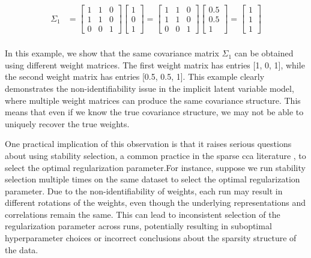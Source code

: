 \begin{align}
    \Sigma_{1} &= \begin{bmatrix}
                         1 & 1 & 0 \\
                         1 & 1 & 0 \\
                         0 & 0 & 1
    \end{bmatrix}\begin{bmatrix}
                     1 \\
                     0 \\
                     1
    \end{bmatrix}=
    \begin{bmatrix}
        1 & 1 & 0 \\
        1 & 1 & 0 \\
        0 & 0 & 1
    \end{bmatrix}\begin{bmatrix}
                     0.5 \\
                     0.5 \\
                     1
    \end{bmatrix}= \begin{bmatrix}
                        1 \\
                        1 \\
                        1
    \end{bmatrix} \\
\end{align}

In this example, we show that the same covariance matrix $\Sigma_1$ can be obtained using different weight matrices. The first weight matrix has entries [1, 0, 1], while the second weight matrix has entries [0.5, 0.5, 1]. This example clearly demonstrates the non-identifiability issue in the implicit latent variable model, where multiple weight matrices can produce the same covariance structure. This means that even if we know the true covariance structure, we may not be able to uniquely recover the true weights.

One practical implication of this observation is that it raises serious questions about using stability selection, a common practice in the sparse \acrshort{cca} literature \citep{mihalik2020multiple, deng2021sparse}, to select the optimal regularization parameter.For instance, suppose we run stability selection multiple times on the same dataset to select the optimal regularization parameter. Due to the non-identifiability of weights, each run may result in different rotations of the weights, even though the underlying representations and correlations remain the same. This can lead to inconsistent selection of the regularization parameter across runs, potentially resulting in suboptimal hyperparameter choices or incorrect conclusions about the sparsity structure of the data.

